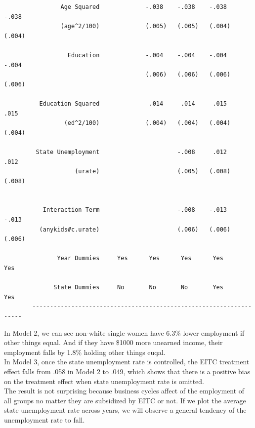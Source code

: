 \documentclass{article}
\begin{document}
\begin{enumerate}
\begin{verbatim}
                Age Squared             -.038    -.038    -.038    -.038
                (age^2/100)             (.005)   (.005)   (.004)   (.004)
                                         
                  Education             -.004    -.004    -.004    -.004
                                        (.006)   (.006)   (.006)   (.006)
                                         
          Education Squared              .014     .014     .015     .015
                 (ed^2/100)             (.004)   (.004)   (.004)   (.004)
                                        
         State Unemployment                      -.008     .012     .012
                    (urate)                      (.005)   (.008)   (.008)
                                                        
          
           Interaction Term                      -.008    -.013    -.013
          (anykids#c.urate)                      (.006)   (.006)   (.006)
                            
               Year Dummies     Yes      Yes      Yes      Yes      Yes
                            
              State Dummies     No       No       No       Yes      Yes
        -------------------------------------------------------------------
        \end{verbatim}

In Model 2, we can see non-white single women have 6.3\% lower employment if other things equal.   
And if they have \$1000 more unearned income, their employment falls by 1.8\% holding other things euqal. \\

In Model 3, once the state unemployment rate is controlled, the EITC treatment effect falls from .058 
in Model 2 to .049, which shows that there is a positive bias on the treatment effect when 
state unemployment rate is omitted.\\

The result is not surprising because business cycles affect of the employment of all groups no matter they are subsidized by EITC or not. 
If we plot the average state unemployment rate across years, we will observe a general tendency of the 
unemployment rate to fall.


\end{enumerate}
\end{document}
